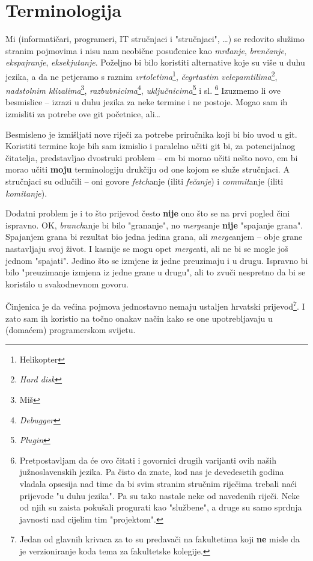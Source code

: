 \chapter*{Terminologija}

Mi (informatičari, programeri, IT stručnjaci i "stručnjaci", \dots) se redovito služimo stranim pojmovima i nisu nam neobične posuđenice kao \emph{mrđanje}, \emph{brenčanje}, \emph{ekspajranje}, \emph{eksekjutanje}.
Poželjno bi bilo koristiti alternative koje su više u duhu jezika, a da ne petjeramo s raznim \emph{vrtoletima}\footnote{Helikopter}, \emph{čegrtastim velepamtilima}\footnote{\emph{Hard disk}}, \emph{nadstolnim klizalima}\footnote{Miš}, \emph{razbubnicima}\footnote{\emph{Debugger}}, \emph{uključnicima}\footnote{\emph{Plugin}} i sl.%
\footnote{Pretpostavljam da će ovo čitati i govornici drugih varijanti ovih naših južnoslavenskih jezika. Pa čisto da znate, kod nas je devedesetih godina vladala opsesija nad time da bi svim stranim stručnim riječima trebali naći prijevode "u duhu jezika". Pa su tako nastale neke od navedenih riječi. Neke od njih su zaista pokušali progurati kao "službene", a druge su samo sprdnja javnosti nad cijelim tim "projektom".}
Izuzmemo li ove besmislice -- izrazi u duhu jezika za neke termine i ne postoje.
Mogao sam ih izmisliti za potrebe ove git početnice, ali\dots

Besmisleno je izmišljati nove riječi za potrebe priručnika koji bi bio uvod u git.
Koristiti termine koje bih sam izmislio i paralelno učiti git bi, za potencijalnog čitatelja, predstavljao dvostruki problem -- em bi morao učiti nešto novo, em bi morao učiti \textbf{moju} terminologiju drukčiju od one kojom se služe stručnjaci.
A stručnjaci su odlučili -- oni govore \emph{fetch}anje (iliti \emph{fečanje}) i \emph{commit}anje (iliti \emph{komitanje}).

Dodatni problem je i to što prijevod često \textbf{nije} ono što se na prvi pogled čini ispravno.
OK, \emph{branch}anje bi bilo "grananje", no \emph{merge}anje \textbf{nije} "spajanje grana". 
Spajanjem grana bi rezultat bio jedna jedina grana, ali \emph{merge}anjem -- obje grane nastavljaju svoj život. 
I kasnije se mogu opet \emph{merge}ati, ali ne bi se mogle još jednom "spajati".
Jedino što se izmjene iz jedne preuzimaju i u drugu. 
Ispravno bi bilo "preuzimanje izmjena iz jedne grane u drugu", ali to zvuči nespretno da bi se koristilo u svakodnevnom govoru.

Činjenica je da većina pojmova jednostavno nemaju ustaljen hrvatski prijevod\footnote{Jedan od glavnih krivaca za to su predavači na fakultetima koji \textbf{ne} misle da je verzioniranje koda tema za fakultetske kolegije.}. 
I zato sam ih koristio na točno onakav način kako se one upotrebljavaju u (domaćem) programerskom svijetu.

